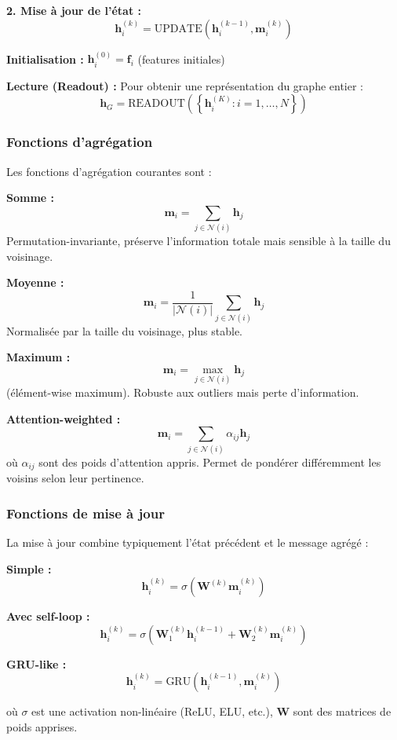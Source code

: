 \textbf{2. Mise à jour de l'état :}
\[
\mathbf{h}_i^{(k)} = \text{UPDATE}\left(\mathbf{h}_i^{(k-1)}, \mathbf{m}_i^{(k)}\right)
\]

\textbf{Initialisation :} $\mathbf{h}_i^{(0)} = \mathbf{f}_i$ (features initiales)

\textbf{Lecture (Readout) :} Pour obtenir une représentation du graphe entier :
\[
\mathbf{h}_G = \text{READOUT}\left(\left\{\mathbf{h}_i^{(K)} : i = 1, \ldots, N\right\}\right)
\]

\subsubsection{Fonctions d'agrégation}

Les fonctions d'agrégation courantes sont :

\textbf{Somme :}
\[
\mathbf{m}_i = \sum_{j \in \mathcal{N}(i)} \mathbf{h}_j
\]
Permutation-invariante, préserve l'information totale mais sensible à la taille du voisinage.

\textbf{Moyenne :}
\[
\mathbf{m}_i = \frac{1}{|\mathcal{N}(i)|}\sum_{j \in \mathcal{N}(i)} \mathbf{h}_j
\]
Normalisée par la taille du voisinage, plus stable.

\textbf{Maximum :}
\[
\mathbf{m}_i = \max_{j \in \mathcal{N}(i)} \mathbf{h}_j
\]
(élément-wise maximum). Robuste aux outliers mais perte d'information.

\textbf{Attention-weighted :}
\[
\mathbf{m}_i = \sum_{j \in \mathcal{N}(i)} \alpha_{ij} \mathbf{h}_j
\]
où $\alpha_{ij}$ sont des poids d'attention appris. Permet de pondérer différemment les voisins selon leur pertinence.

\subsubsection{Fonctions de mise à jour}

La mise à jour combine typiquement l'état précédent et le message agrégé :

\textbf{Simple :}
\[
\mathbf{h}_i^{(k)} = \sigma\left(\mathbf{W}^{(k)} \mathbf{m}_i^{(k)}\right)
\]

\textbf{Avec self-loop :}
\[
\mathbf{h}_i^{(k)} = \sigma\left(\mathbf{W}_1^{(k)} \mathbf{h}_i^{(k-1)} + \mathbf{W}_2^{(k)} \mathbf{m}_i^{(k)}\right)
\]

\textbf{GRU-like :}
\[
\mathbf{h}_i^{(k)} = \text{GRU}\left(\mathbf{h}_i^{(k-1)}, \mathbf{m}_i^{(k)}\right)
\]

où $\sigma$ est une activation non-linéaire (ReLU, ELU, etc.), $\mathbf{W}$ sont des matrices de poids apprises.

